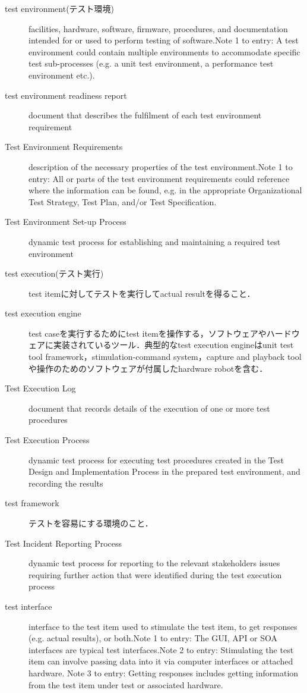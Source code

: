 \begin{description}
    \item[test environment(テスト環境)]facilities, hardware, software, firmware, procedures, and documentation intended for or used to perform testing of software.Note 1 to entry: A test environment could contain multiple environments to accommodate specific test sub-processes (e.g. a unit test environment, a performance test environment etc.).
    \item[test environment readiness report]document that describes the fulfilment of each test environment requirement
    \item[Test Environment Requirements]description of the necessary properties of the test environment.Note 1 to entry: All or parts of the test environment requirements could reference where the information can be found, e.g. in the appropriate Organizational Test Strategy, Test Plan, and/or Test Specification.
    \item[Test Environment Set-up Process]dynamic test process for establishing and maintaining a required test environment
    \item[test execution(テスト実行)]test itemに対してテストを実行してactual resultを得ること．
    \item[test execution engine]test caseを実行するためにtest itemを操作する，ソフトウェアやハードウェアに実装されているツール．典型的なtest execution engineはunit test tool framework，stimulation-command system，capture and playback toolや操作のためのソフトウェアが付属したhardware robotを含む．
    \item[Test Execution Log]document that records details of the execution of one or more test procedures
    \item[Test Execution Process]dynamic test process for executing test procedures created in the Test Design and Implementation Process in the prepared test environment, and recording the results
    \item[test framework]テストを容易にする環境のこと．
    \item[Test Incident Reporting Process]dynamic test process for reporting to the relevant stakeholders issues requiring further action that were identified during the test execution process
    \item[test interface]interface to the test item used to stimulate the test item, to get responses (e.g. actual results), or both.Note 1 to entry: The GUI, API or SOA interfaces are typical test interfaces.Note 2 to entry: Stimulating the test item can involve passing data into it via computer interfaces or attached hardware. Note 3 to entry: Getting responses includes getting information from the test item under test or associated hardware.

\end{description}
